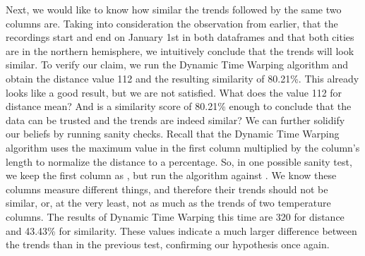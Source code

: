 Next, we would like to know how similar the trends followed by the same two columns are.
Taking into consideration the observation from earlier, that the recordings start and end on January 1st in both dataframes
and that both cities are in the northern hemisphere, we intuitively conclude that the trends will look similar.
To verify our claim, we run the Dynamic Time Warping algorithm and obtain the distance value 112 and the resulting similarity
of 80.21\%.
This already looks like a good result, but we are not satisfied.
What does the value 112 for distance mean?
And is a similarity score of 80.21\% enough to conclude that the data can be trusted and the trends are indeed similar?
We can further solidify our beliefs by running sanity checks.
Recall that the Dynamic Time Warping algorithm uses the maximum value in the first column multiplied by the column's length
to normalize the distance to a percentage.
So, in one possible sanity test, we keep the first column as , but run the algorithm against .
We know these columns measure different things, and therefore their trends should not be similar, or, at the very least,
not as much as the trends of two temperature columns.
The results of Dynamic Time Warping this time are 320 for distance and 43.43\% for similarity.
These values indicate a much larger difference between the trends than in the previous test, confirming our hypothesis once again.